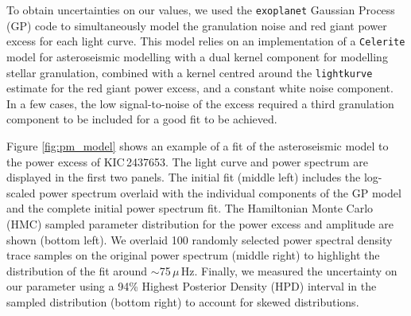 To obtain uncertainties on our \numax{} values, we used the \texttt{exoplanet} Gaussian Process (GP) code \citep{foreman-mackey_fast_2017} to simultaneously model the granulation noise and red giant power excess for each light curve. This model relies on an implementation of a \texttt{Celerite} model for asteroseismic modelling with a dual kernel component for modelling stellar granulation, combined with a kernel centred around the \texttt{lightkurve} \numax{} estimate for the red giant power excess, and a constant white noise component. In a few cases, the low signal-to-noise of the excess required a third granulation component to be included for a good fit to be achieved. 

Figure \ref{fig:pm_model} shows an example of a fit of the asteroseismic model to the power excess of KIC\,2437653. The light curve and power spectrum are displayed in the first two panels. The initial fit (middle left) includes the log-scaled power spectrum overlaid with the individual components of the GP model and the complete initial power spectrum fit. The Hamiltonian Monte Carlo (HMC) sampled parameter distribution for the power excess and amplitude are shown (bottom left). We overlaid 100 randomly selected power spectral density trace samples on the original power spectrum (middle right) to highlight the distribution of the fit around \numax{}$\sim$75\,$\mu$\,Hz. Finally, we measured the uncertainty on our \numax{} parameter using a 94\% Highest Posterior Density (HPD) interval in the sampled distribution (bottom right) to account for skewed distributions.

